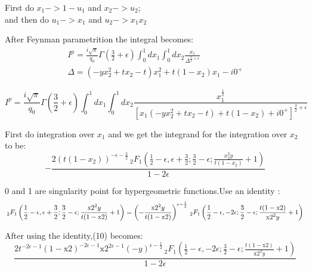 \documentclass{article}
\begin{document}
First do $x_1->1-u_1$ and $x_2->u_2$;\\and then do $u_1->x_1$ and $u_2->x_1x_2$






After Feynman parametrition the integral becomes:\\
\begin{eqnarray}
I^p=\frac{i\sqrt{\pi}}{q_0}\Gamma(\frac{3}{2}+\epsilon)\int_0^1dx_1 \int_0^1dx_2 \frac{x_1}{\Delta^{\frac{3}{2}+\epsilon}}\\
\Delta=(-yx_2^2+tx_2-t)x_1^2+t(1-x_2)x_1-i0^+
\end{eqnarray}

\begin{equation}
I^p=\frac{ i\sqrt{\pi}}{q_0}\Gamma(\frac{3}{2}+\epsilon)\int_0^1dx_1 \int_0^1dx_2
\frac{x_1^{\frac{1}{2}}}{[{x_1(-yx_2^2+tx_2-t)+t(1-x_2)+i0^+}]^{\frac{3}{2}+\epsilon}}
\end{equation}

First do integration over $x_1$ and we get the integrand for the integration over $x_2$ to be:\\
\begin{equation}
-\frac{2 (t (1-x_2))^{-\epsilon -\frac{3}{2}} \, _2F_1\left(\frac{1}{2}-\epsilon ,\epsilon +\frac{3}{2};\frac{3}{2}-\epsilon ;\frac{x_2^2 y}{t (1-x_2)}+1\right)}{1-2 \epsilon }
\end{equation}

0 and 1 are singularity point for hypergeometric functions.Use an identity :\\
\begin{equation*}
\, _2F_1\left(\frac{1}{2}-\epsilon ,\epsilon +\frac{3}{2};\frac{3}{2}-\epsilon ;\frac{\text{x2}^2 y}{t (1-\text{x2})}+1\right)=\left(-\frac{\text{x2}^2 y}{t (1-\text{x2})}\right)^{\epsilon -\frac{1}{2}} \, _2F_1\left(\frac{1}{2}-\epsilon ,-2 \epsilon ;\frac{3}{2}-\epsilon ;\frac{t (1-\text{x2})}{\text{x2}^2 y}+1\right)\\
\end{equation*}


After using the identity,(10) becomes:\\
\begin{equation*}
\frac{2 t^{-2 \epsilon -1} (1-\text{x2})^{-2 \epsilon -1} \text{x2}^{2 \epsilon -1} (-y)^{\epsilon -\frac{1}{2}} \, _2F_1\left(\frac{1}{2}-\epsilon ,-2 \epsilon ;\frac{3}{2}-\epsilon ;\frac{t (1-\text{x2})}{\text{x2}^2 y}+1\right)}{1-2 \epsilon }
\end{equation*}
\end{document}
